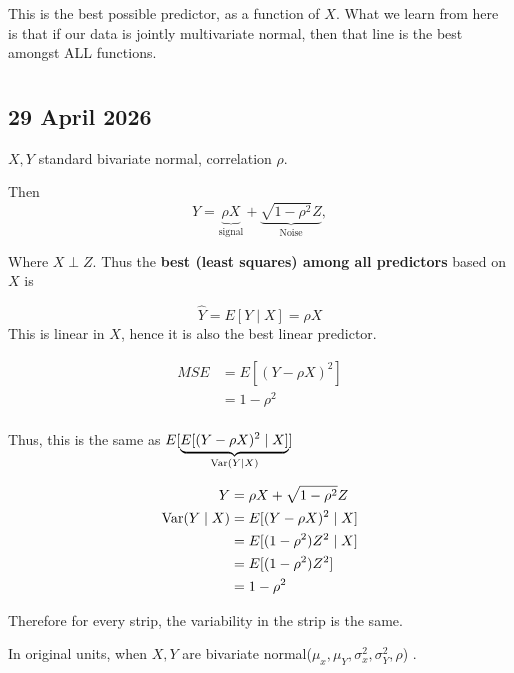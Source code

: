 \documentclass{report}
\begin{document}
This is the best possible predictor, as a function of $X$. What we learn from here is that if our data is jointly multivariate normal, then that line is the best amongst ALL functions. 

\chapter{}


\section{29 April 2026}

$X,Y$ standard bivariate normal, correlation $\rho$. 

Then 
\[
	Y = \underbrace{\rho X}_{\text{signal}} + \underbrace{\sqrt{1-\rho^{2}}Z}_{\text{Noise}}, 
\]

Where $X \perp Z$. Thus the \textbf{best (least squares) among all predictors} based on $X$ is 

\[
\hat Y = E[Y \mid X] = \rho X
\] 
This is linear in $X$, hence it is also the best linear predictor. 

\begin{align*}
	MSE &= E[ (Y - \rho X)^{2}] \\
	&= 1-\rho^{2} \\
\end{align*}


Thus, this is the same as $E[\underbrace{E[(Y-\rho X)^{2} \mid X]}_{\operatorname{Var}(Y \mid X)}]$ 

\begin{align*}
	Y &= \rho X + \sqrt{1-\rho^{2}}Z \\
	\operatorname{Var}(Y \mid X) &= E[ (Y - \rho X)^{2} \mid X] \\
	&= E[( 1 - \rho^{2})Z^{2} \mid X ] \\
	&= E[(1-\rho^{2})Z^{2}] \\
	&= 1-\rho^{2} \\
\end{align*}

Therefore for every strip, the variability in the strip is the same. 


In original units, when $X, Y$ are bivariate normal($\mu _{x}, \mu _{Y}, \sigma_{x}^{2}, \sigma_{Y}^{2}, \rho$) . 

\end{document}
